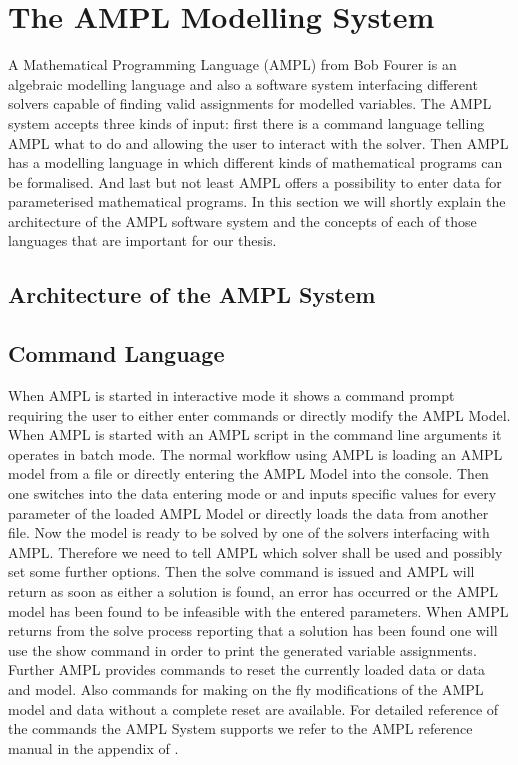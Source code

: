 \section{The AMPL Modelling System}
\label{sec:AMPL}
A Mathematical Programming Language (AMPL) from Bob Fourer \cite{AMPL} is an algebraic modelling language and also a software system interfacing different solvers capable of finding valid assignments for modelled variables. The AMPL system accepts three kinds of input: first there is a command language telling AMPL what to do and allowing the user to interact with the solver. Then AMPL has a modelling language in which different kinds of mathematical programs can be formalised. And last but not least AMPL offers a possibility to enter data for parameterised mathematical programs. In this section we will shortly explain the architecture of the AMPL software system and the concepts of each of those languages that are important for our thesis.
\subsection{Architecture of the AMPL System}
\subsection{Command Language}
When AMPL is started in interactive mode it shows a command prompt requiring the user to either enter commands or directly modify the AMPL Model. When AMPL is started with an AMPL script in the command line arguments it operates in batch mode.
The normal workflow using AMPL is loading an AMPL model from a file or directly entering the AMPL Model into the console. Then one switches into the data entering mode or and inputs specific values for every parameter of the loaded AMPL Model or directly loads the data from another file. Now the model is ready to be solved by one of the solvers interfacing with AMPL. Therefore we need to tell AMPL which solver shall be used and possibly set some further options. Then the solve command is issued and AMPL will return as soon as either a solution is found, an error has occurred or the AMPL model has been found to be infeasible with the entered parameters. When AMPL returns from the solve process reporting that a solution has been found one will use the show command in order to print the generated variable assignments.
Further AMPL provides commands to reset the currently loaded data or data and model. Also commands for making on the fly modifications of the AMPL model and data without a complete reset are available. For detailed reference of the commands the AMPL System supports we refer to the AMPL reference manual in the appendix of \cite{AMPL}.
